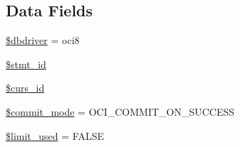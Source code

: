 \subsection*{Data Fields}
\begin{DoxyCompactItemize}
\item 
\mbox{\hyperlink{class_c_i___d_b__oci8__driver_a0cde2a16322a023d040aa7f725877597}{\$dbdriver}} = \textquotesingle{}oci8\textquotesingle{}
\item 
\mbox{\hyperlink{class_c_i___d_b__oci8__driver_a1a97f17fd259cd27c73b65e6c3706ec0}{\$stmt\+\_\+id}}
\item 
\mbox{\hyperlink{class_c_i___d_b__oci8__driver_a75e7d18ad2e68ace3813533c9da2e179}{\$curs\+\_\+id}}
\item 
\mbox{\hyperlink{class_c_i___d_b__oci8__driver_a9b3b7163763603c5a0bcdfd819ae074d}{\$commit\+\_\+mode}} = O\+C\+I\+\_\+\+C\+O\+M\+M\+I\+T\+\_\+\+O\+N\+\_\+\+S\+U\+C\+C\+E\+SS
\item 
\mbox{\hyperlink{class_c_i___d_b__oci8__driver_a96df35d7e3e76bef21ebb80234fe59e8}{\$limit\+\_\+used}} = F\+A\+L\+SE
\end{DoxyCompactItemize}
